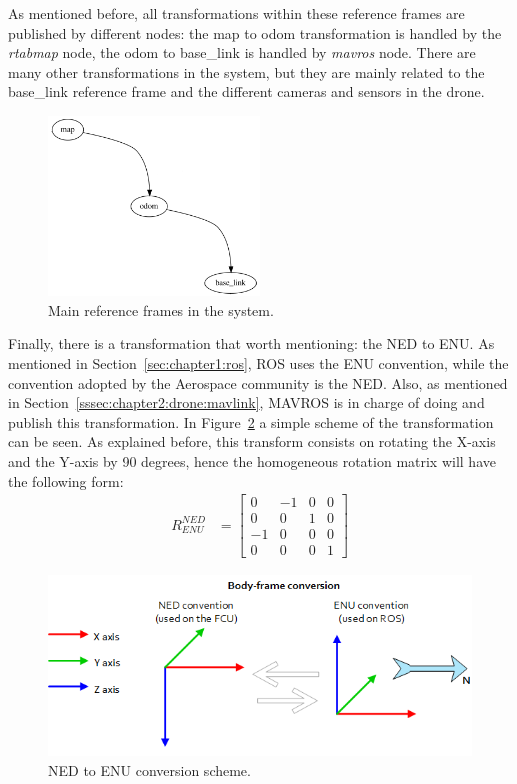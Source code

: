 As mentioned before, all transformations within these reference frames are published by different nodes: the map to odom transformation is handled by the \emph{rtabmap} node, the odom to base\_link is handled by \emph{mavros} node. There are many other transformations in the system, but they are mainly related to the base\_link reference frame and the different cameras and sensors in the drone. \\
\begin{figure}
    \centering
    \includegraphics[width=0.5\textwidth]{Images/fig5-frames.png}
    \caption{Main reference frames in the system.}
    \label{fig:chapter2:drone:frames:frames}
\end{figure}

Finally, there is a transformation that worth mentioning: the \ac{NED} to \ac{ENU}. As mentioned in Section~\ref{sec:chapter1:ros}, ROS uses the ENU convention, while the convention adopted by the Aerospace community is the NED. Also, as mentioned in Section~\ref{sssec:chapter2:drone:mavlink}, MAVROS is in charge of doing and publish this transformation. In Figure~\ref{fig:chapter2:drone:frames:enu2ned} a simple scheme of the transformation can be seen. As explained before, this transform consists on rotating the X-axis and the Y-axis by 90 degrees, hence the homogeneous rotation matrix will have the following form:
\begin{align}
    R_{ENU}^{NED} & = \begin{bmatrix}
        0 & -1 & 0 & 0 \\
        0 & 0 & 1 & 0 \\
        -1 & 0 & 0 & 0 \\
        0 & 0 & 0 & 1
    \end{bmatrix}
\end{align}


\begin{figure}
    \centering
    \includegraphics[width=\textwidth]{Images/fig6-ned2enu.png}
    \caption{NED to ENU conversion scheme. \cite{mavros}}
    \label{fig:chapter2:drone:frames:enu2ned}
\end{figure}

